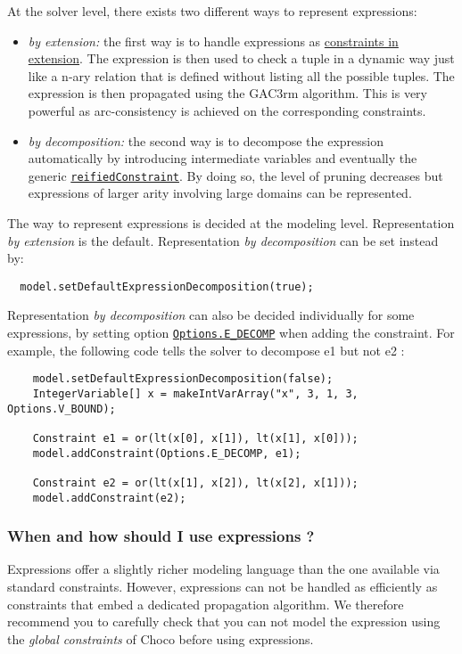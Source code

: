At the solver level, there exists two different ways to represent expressions:
\begin{itemize}
\item \emph{by extension:} the first way is to handle expressions as \hyperlink{model:arbitraryconstraintsinextension}{constraints in extension}. The expression is then used to check a tuple in a dynamic way just like a n-ary relation that is defined without listing all the possible tuples. The expression is then propagated using the GAC3rm algorithm. This is very powerful as arc-consistency is achieved on the corresponding constraints.
\item \emph{by decomposition:} the second way is to decompose the expression automatically by introducing intermediate variables and eventually the generic \hyperlink{reifiedconstraint:reifiedconstraintconstraint}{\tt reifiedConstraint}. By doing so, the level of pruning decreases but expressions of larger arity involving large domains can be represented.
\end{itemize}
The way to represent expressions is decided at the modeling level. Representation \emph{by extension} is the default. Representation \emph{by decomposition} can be set instead by:
\begin{lstlisting}
  model.setDefaultExpressionDecomposition(true);
\end{lstlisting}

Representation \emph{by decomposition} can also be decided individually for some expressions, by setting option \hyperlink{edecomp:edecompoptions}{\tt Options.E\_DECOMP} when adding the constraint.
For example, the following code tells the solver to decompose e1 but not e2 :
\begin{lstlisting}
	model.setDefaultExpressionDecomposition(false);
	IntegerVariable[] x = makeIntVarArray("x", 3, 1, 3, Options.V_BOUND);

	Constraint e1 = or(lt(x[0], x[1]), lt(x[1], x[0]));
	model.addConstraint(Options.E_DECOMP, e1);
	
	Constraint e2 = or(lt(x[1], x[2]), lt(x[2], x[1]));
	model.addConstraint(e2);
\end{lstlisting}

\subsubsection{When and how should I use expressions ?}\label{model:whenshouldiuseexpressions}\hypertarget{model:whenshouldiuseexpressions}{}
Expressions offer a slightly richer modeling language than the one available via standard constraints. However, expressions 
can not be handled as efficiently as constraints that embed a dedicated propagation algorithm. We therefore
recommend you to carefully check that you can not model the expression using the \emph{global constraints} of Choco before using
expressions.

